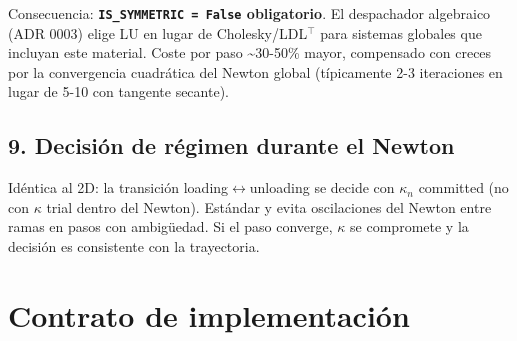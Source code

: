 \documentclass[11pt,letterpaper,oneside]{report}
\begin{document}
Consecuencia: \textbf{\texttt{IS\_SYMMETRIC = False} obligatorio}. El despachador algebraico (ADR 0003) elige LU en lugar de Cholesky/LDL\ensuremath{^{\top}} para sistemas globales que incluyan este material. Coste por paso \textasciitilde{}30-50\% mayor, compensado con creces por la convergencia cuadrática del Newton global (típicamente 2-3 iteraciones en lugar de 5-10 con tangente secante).

\subsection{9. Decisión de régimen durante el Newton}

Idéntica al 2D: la transición loading\ensuremath{\leftrightarrow}unloading se decide con $\kappa_n$ committed (no con $\kappa$ trial dentro del Newton). Estándar y evita oscilaciones del Newton entre ramas en pasos con ambigüedad. Si el paso converge, $\kappa$ se compromete y la decisión es consistente con la trayectoria.


\section{Contrato de implementación}
\end{document}
